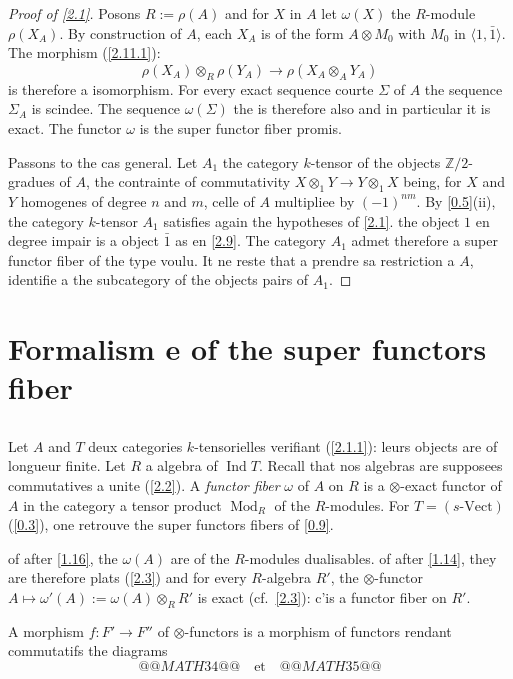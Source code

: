 \documentclass[11pt,a4paper]{article}
\theoremstyle{plain}
\theoremstyle{definition}
\DeclareMathOperator{\Ind}{Ind}
\newcommand{\Vect}{\mathrm{Vect}}
\newcommand{\Mod}{\operatorname{Mod}}
\begin{document}
\begin{proof}[Proof of \ref{2.1}]
Posons $R:=\rho(A)$ and for $X$ in $A$ let $\omega(X)$ the $R$-module $\rho(X_A)$. By construction of $A$, each $X_A$ is of the form $A\otimes M_0$ with $M_0$ in $\langle1,\bar{1}\rangle$. The morphism (\ref{2.11.1}):
\[
\rho(X_A)\otimes_R\rho(Y_A)\to\rho(X_A\otimes_A Y_A)
\]
is therefore a isomorphism. For every exact sequence courte $\Sigma$ of $A$ the sequence $\Sigma_A$ is scindee. The sequence $\omega(\Sigma)$ the is therefore also and in particular it is exact. The functor $\omega$ is the super functor fiber promis.

Passons to the cas general. Let $A_1$ the category $k$-tensor of the objects $\mathbb{Z}/2$-gradues of $A$, the contrainte of commutativity $X\otimes_1Y\to Y\otimes_1X$ being, for $X$ and $Y$ homogenes of degree $n$ and $m$, celle of $A$ multipliee by $(-1)^{nm}$. By \ref{0.5}(ii), the category $k$-tensor $A_1$ satisfies again the hypotheses of \ref{2.1}. the object $1$ en degree impair is a object $\bar{1}$ as en \ref{2.9}. The category $A_1$ admet therefore a super functor fiber of the type voulu. It ne reste that a prendre sa restriction a $A$, identifie a the subcategory of the objects pairs of $A_1$.
\end{proof}

\section{Formalism e of the super functors fiber}\label{3}

\subsection{}\label{3.1}

Let $A$ and $T$ deux categories $k$-tensorielles verifiant (\ref{2.1.1}): leurs objects are of longueur finite. Let $R$ a algebra of $\Ind T$. Recall that nos algebras are supposees commutatives a unite (\ref{2.2}). A \emph{functor fiber} $\omega$ of $A$ on $R$ is a $\otimes$-exact functor of $A$ in the category a tensor product $\Mod_R$ of the $R$-modules. For $T=(s\text{-}\Vect)$ (\ref{0.3}), one retrouve the super functors fibers of \ref{0.9}.

of after \ref{1.16}, the $\omega(A)$ are of the $R$-modules dualisables. of after \ref{1.14}, they are therefore plats (\ref{2.3}) and for every $R$-algebra $R'$, the $\otimes$-functor $A\mapsto\omega'(A):=\omega(A)\otimes_R R'$ is exact (cf.~\ref{2.3}): c'is a functor fiber on $R'$.

A morphism $f:F'\to F''$ of $\otimes$-functors is a morphism of functors rendant commutatifs the diagrams
\[
@@MATH34@@
\quad\text{et}\quad
@@MATH35@@
\]
\end{document}
